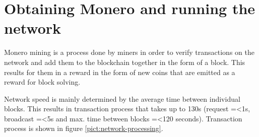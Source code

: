 \documentclass[
  printed, %
  table,   %
  nolof,     %
  nolot,     %
           oneside, color
]{fithesis3}
\begin{document}
\chapter{Obtaining Monero and running the network}
Monero mining is a process done by miners in order to verify transactions on the network and add them to the blockchain together in the form of a block. This results for them in a reward in the form of new coins that are emitted as a reward for block solving.

Network speed is mainly determined by the average time between individual blocks. %
This results in transaction process that takes up to 130s (request =\textless 1s, broadcast =\textless 5s and max. time between blocks =\textless 120 seconds).  Transaction process is shown in figure \ref{pict:network-processing}.
\end{document}
